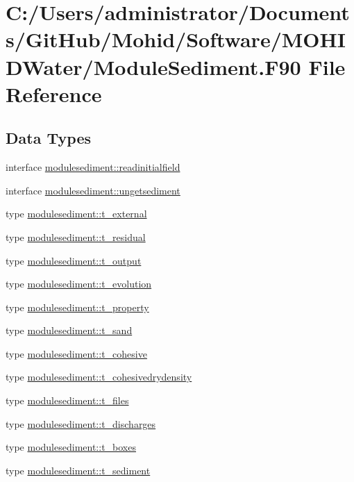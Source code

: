 \hypertarget{_module_sediment_8_f90}{}\section{C\+:/\+Users/administrator/\+Documents/\+Git\+Hub/\+Mohid/\+Software/\+M\+O\+H\+I\+D\+Water/\+Module\+Sediment.F90 File Reference}
\label{_module_sediment_8_f90}
\subsection*{Data Types}
\begin{DoxyCompactItemize}
\item 
interface \mbox{\hyperlink{interfacemodulesediment_1_1readinitialfield}{modulesediment\+::readinitialfield}}
\item 
interface \mbox{\hyperlink{interfacemodulesediment_1_1ungetsediment}{modulesediment\+::ungetsediment}}
\item 
type \mbox{\hyperlink{structmodulesediment_1_1t__external}{modulesediment\+::t\+\_\+external}}
\item 
type \mbox{\hyperlink{structmodulesediment_1_1t__residual}{modulesediment\+::t\+\_\+residual}}
\item 
type \mbox{\hyperlink{structmodulesediment_1_1t__output}{modulesediment\+::t\+\_\+output}}
\item 
type \mbox{\hyperlink{structmodulesediment_1_1t__evolution}{modulesediment\+::t\+\_\+evolution}}
\item 
type \mbox{\hyperlink{structmodulesediment_1_1t__property}{modulesediment\+::t\+\_\+property}}
\item 
type \mbox{\hyperlink{structmodulesediment_1_1t__sand}{modulesediment\+::t\+\_\+sand}}
\item 
type \mbox{\hyperlink{structmodulesediment_1_1t__cohesive}{modulesediment\+::t\+\_\+cohesive}}
\item 
type \mbox{\hyperlink{structmodulesediment_1_1t__cohesivedrydensity}{modulesediment\+::t\+\_\+cohesivedrydensity}}
\item 
type \mbox{\hyperlink{structmodulesediment_1_1t__files}{modulesediment\+::t\+\_\+files}}
\item 
type \mbox{\hyperlink{structmodulesediment_1_1t__discharges}{modulesediment\+::t\+\_\+discharges}}
\item 
type \mbox{\hyperlink{structmodulesediment_1_1t__boxes}{modulesediment\+::t\+\_\+boxes}}
\item 
type \mbox{\hyperlink{structmodulesediment_1_1t__sediment}{modulesediment\+::t\+\_\+sediment}}
\end{DoxyCompactItemize}
